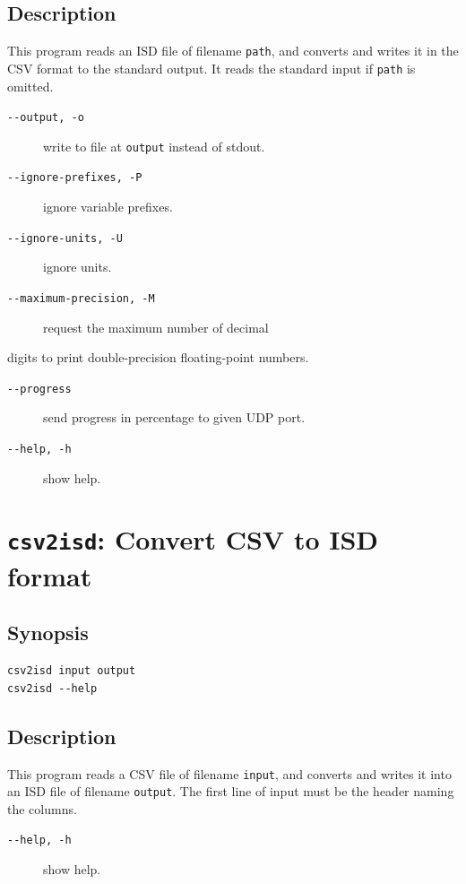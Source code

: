 \documentclass[a4paper,10pt]{report}
\begin{document}
\subsection{Description}
\label{sec:org84cc271}
This program reads an ISD file of filename \texttt{path}, and converts and writes
it in the CSV format to the standard output.
It reads the standard input if \texttt{path} is omitted.

\begin{description}
\item[{\texttt{-{}-output, -o}}] write to file at \texttt{output} instead of stdout.
\item[{\texttt{-{}-ignore-prefixes, -P}}] ignore variable prefixes.
\item[{\texttt{-{}-ignore-units, -U}}] ignore units.
\item[{\texttt{-{}-maximum-precision, -M}}] request the maximum number of decimal
\end{description}
digits to print double-precision floating-point numbers.
\begin{description}
\item[{\texttt{-{}-progress}}] send progress in percentage to given UDP port.
\item[{\texttt{-{}-help, -h}}] show help.
\end{description}

\section{\label{org4c62313} \texttt{csv2isd}: Convert CSV to ISD format}
\label{sec:org571dd23}

\subsection{Synopsis}
\label{sec:org3c13d54}
\begin{verbatim}
csv2isd input output
csv2isd --help
\end{verbatim}

\subsection{Description}
\label{sec:org3d47576}
This program reads a CSV file of filename \texttt{input}, and converts and writes
it into an ISD file of filename \texttt{output}.
The first line of input must be the header naming the columns.

\begin{description}
\item[{\texttt{-{}-help, -h}}] show help.
\end{description}
\end{document}
